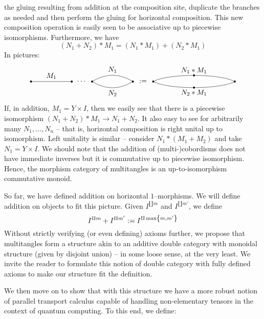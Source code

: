 \documentclass{amsart}
\renewcommand{\to}[1][]{\stackrel{#1}{\longrightarrow}}
\newcommand{\curly}[1]{\left\{ #1 \right\}}
\newcommand{\set}[2][]{\ifthenelse{\equal{#1}{}}
                                  {\curly{#2}}
                                  {\curly{#1\ \textbf{:}\ #2}}}
\newcommand{\vertinnersep}{1pt}
\newcommand{\colvert}[3]{
\node[circle, fill, inner sep=\vertinnersep, #1] at (#2) (#3) {};
}
\newcommand{\lblvert}[3]{
\node at (#1) (#2) {#3};
}
\numberwithin{thm}{section}
\theoremstyle{definition}
\begin{document}
the gluing resulting from addition at the composition site, duplicate the
branches as needed and then perform the gluing for horizontal composition. This
new composition operation is easily seen to be associative up to piecewise
isomorphisms. Furthermore, we have
\[
  (N_1 + N_2) * M_1 = (N_1 * M_1) + (N_2 * M_1)
\]
In pictures:
\[\begin{tikzpicture}
\colvert{black}{1, 0}{X}
\colvert{black}{3, 0}{Y}
\lblvert{3.5, 0}{glue}{$\cdots$}
\colvert{black}{4, 0}{YY}
\colvert{black}{6, 0}{Z}
\path
  (X)  edge   node[above]{$M_1$}   (Y)
  (YY) edge[bend left]   node[above]{$N_1$}  (Z)
  (YY) edge[bend right]  node[below]{$N_2$} (Z)
  ;
\lblvert{6.5, 0}{equals}{$:=$}
\colvert{black}{7, 0}{XX}
\colvert{black}{9, 0.30}{YYY}
\colvert{black}{9, -0.30}{YYYY}
\colvert{black}{11, 0}{ZZ}
\draw (XX) .. controls (7.5, 0.25) and (8.5, 0.30) .. (YYY);
\draw (YYY) .. controls (9.5, 0.30) and (10.5, 0.25) .. (ZZ);
\draw (XX) .. controls (7.5, -0.25) and (8.5, -0.30) .. (YYYY);
\draw (YYYY) .. controls (9.5, -0.30) and (10.5, -0.25) .. (ZZ);

\lblvert{9, 0.55}{NM}{$N_1 * M_1$}
\lblvert{9, -0.55}{NNMM}{$N_2 * M_1$}
\end{tikzpicture}\]
If, in addition, $M_1 = Y \times I$, then we easily see that there is a
piecewise isomorphism $(N_1 + N_2) * M_1 \to N_1 + N_2$. It also easy to see for
arbitrarily many $N_1, \dots, N_n$ -- that is, horizontal
composition is right unital up to isomorphism. Left unitality is similar --
consider $N_1 * (M_1 + M_2)$ and take $N_1 = Y \times I$. We should note that
the addition of (multi-)cobordisms does not have immediate inverses but it is
commutative up to piecewise isomorphism. Hence, the morphism category of
multitangles is an up-to-isomorphism commutative monoid.

So far, we have defined addition on horizontal $1$--morphisms. We will define
addition on objects to fit this picture. Given $I^{\amalg m}$ and
$I^{\amalg m'}$, we define
\[
  I^{\amalg m} + I^{\amalg m'} := I^{\amalg \max\set{m, m'}}
\]
Without strictly verifying (or even defining) axioms further, we propose that
multitangles form a structure akin to an additive double category with
monoidal structure (given by disjoint union) -- in some loose sense, at the very
least. We invite the reader to formulate this notion of double category with
fully defined axioms to make our structure fit the definition.

We then move on to show that with this structure we have a more robust notion of
parallel transport calculus capable of handling non-elementary tensors in the
context of quantum computing. To this end, we define:
\end{document}
